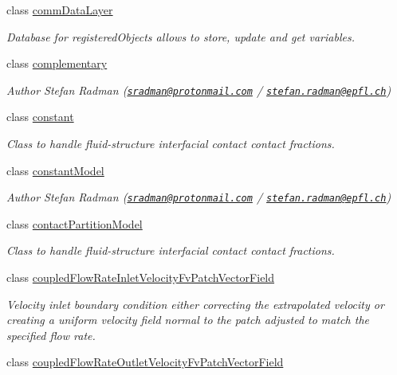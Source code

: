 \begin{DoxyCompactItemize}
class \hyperlink{classFoam_1_1commDataLayer}{comm\+Data\+Layer}
\begin{DoxyCompactList}\small\item\em Database for registered\+Objects allows to store, update and get variables. \end{DoxyCompactList}\item 
class \hyperlink{classFoam_1_1complementary}{complementary}
\begin{DoxyCompactList}\small\item\em Author Stefan Radman (\href{mailto:sradman@protonmail.com}{\tt sradman@protonmail.\+com} / \href{mailto:stefan.radman@epfl.ch}{\tt stefan.\+radman@epfl.\+ch}) \end{DoxyCompactList}\item 
class \hyperlink{classFoam_1_1constant}{constant}
\begin{DoxyCompactList}\small\item\em Class to handle fluid-\/structure interfacial contact contact fractions. \end{DoxyCompactList}\item 
class \hyperlink{classFoam_1_1constantModel}{constant\+Model}
\begin{DoxyCompactList}\small\item\em Author Stefan Radman (\href{mailto:sradman@protonmail.com}{\tt sradman@protonmail.\+com} / \href{mailto:stefan.radman@epfl.ch}{\tt stefan.\+radman@epfl.\+ch}) \end{DoxyCompactList}\item 
class \hyperlink{classFoam_1_1contactPartitionModel}{contact\+Partition\+Model}
\begin{DoxyCompactList}\small\item\em Class to handle fluid-\/structure interfacial contact contact fractions. \end{DoxyCompactList}\item 
class \hyperlink{classFoam_1_1coupledFlowRateInletVelocityFvPatchVectorField}{coupled\+Flow\+Rate\+Inlet\+Velocity\+Fv\+Patch\+Vector\+Field}
\begin{DoxyCompactList}\small\item\em Velocity inlet boundary condition either correcting the extrapolated velocity or creating a uniform velocity field normal to the patch adjusted to match the specified flow rate. \end{DoxyCompactList}\item 
class \hyperlink{classFoam_1_1coupledFlowRateOutletVelocityFvPatchVectorField}{coupled\+Flow\+Rate\+Outlet\+Velocity\+Fv\+Patch\+Vector\+Field}

\end{DoxyCompactItemize}
